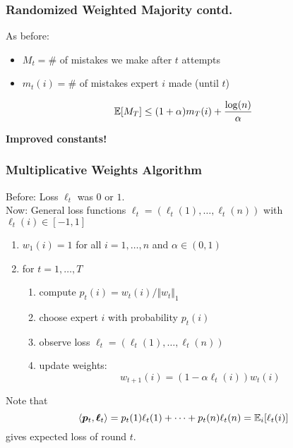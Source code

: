 \documentclass{beamer}
\begin{document}
\begin{frame}
  \frametitle{Randomized Weighted Majority contd.}
  As before:
  \begin{itemize}
    \item $M_t= \#$ of mistakes we make after $t$ attempts
    \item $m_t(i) = \#$ of mistakes expert $i$ made (until $t$)
  \end{itemize}

    \begin{theorem}
      \begin{equation}
        \mathbb{E}[M_T] \le (1+\alpha)m_T(i) + \frac{\log(n)}{\alpha}
      \end{equation}
    \end{theorem}
    \textbf{Improved constants!}
\end{frame}




\begin{frame}
  \frametitle{Multiplicative Weights Algorithm}
  Before: Loss $\ell_t$ was $0$ or $1$. \\
  Now: General loss functions $\bm{\ell}_t= (\ell_t(1), \dots, \ell_t(n))$ with $\ell_t(i) \in [-1, 1]$
  \begin{enumerate}
    \item $w_1(i) = 1$ for all $i = 1, \dots, n$ and $\alpha \in (0, 1)$
    \item for $t=1, \dots, T$
      \begin{enumerate}
        \item compute $p_t(i) = w_t(i)/\Vert w_t \Vert_1$
        \item choose expert $i$ with probability $p_t(i)$
        \item observe loss $\bm{\ell}_t= (\ell_t(1), \dots, \ell_t(n))$
        \item update weights:
          \begin{equation}
            w_{t+1}(i) = (1-\alpha \ell_t(i)) w_t(i)
          \end{equation}
      \end{enumerate}
  \end{enumerate}

  Note that
  \begin{equation}
    \langle \bm{p}_t, \bm{\ell}_t \rangle = p_t(1)\ell_t(1) + \cdots + p_t(n)\ell_t(n) = \mathbb{E}_i[\ell_t(i)]
  \end{equation}
  gives expected loss of round $t$.
\end{frame}
\end{document}
